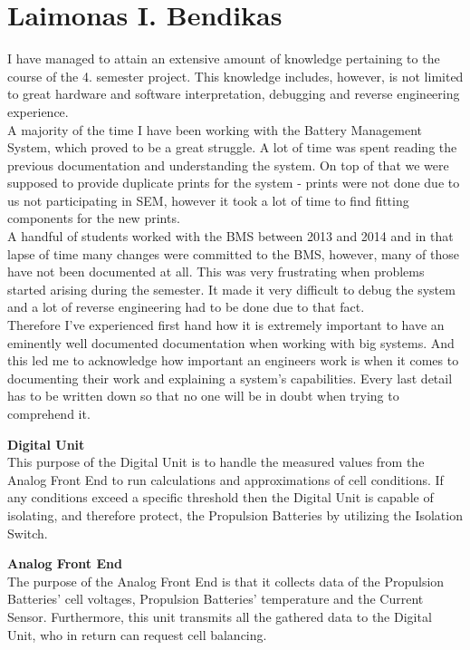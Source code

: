 \section{Laimonas I. Bendikas}
I have managed to attain an extensive amount of knowledge pertaining to the course of the 4. semester project. This knowledge includes, however, is not limited to great hardware and software interpretation, debugging and reverse engineering experience.\\
A majority of the time I have been working with the Battery Management System, which proved to be a great struggle. A lot of time was spent reading the previous documentation and understanding the system. On top of that we were supposed to provide duplicate prints for the system - prints were not done due to us not participating in SEM, however it took a lot of time to find fitting components for the new prints.\\
A handful of students worked with the BMS between 2013 and 2014 and in that lapse of time many changes were committed to the BMS, however, many of those have not been documented at all. This was very frustrating when problems started arising during the semester. It made it very difficult to debug the system and a lot of reverse engineering had to be done due to that fact.\\
Therefore I've experienced first hand how it is extremely important to have an eminently well documented documentation when working with big systems. And this led me to acknowledge how important an engineers work is when it comes to documenting their work and explaining a system's capabilities. Every last detail has to be written down so that no one will be in doubt when trying to comprehend it. 

\textbf{Digital Unit}\\
This purpose of the Digital Unit is to handle the measured values from the Analog Front End to run calculations and approximations of cell conditions. If any conditions exceed a specific threshold then the Digital Unit is capable of isolating, and therefore protect, the Propulsion Batteries by utilizing the Isolation Switch.

\textbf{Analog Front End}\\
The purpose of the Analog Front End is that it collects data of the Propulsion Batteries' cell voltages, Propulsion Batteries' temperature and the Current Sensor. Furthermore, this unit transmits all the gathered data to the Digital Unit, who in return can request cell balancing. 

